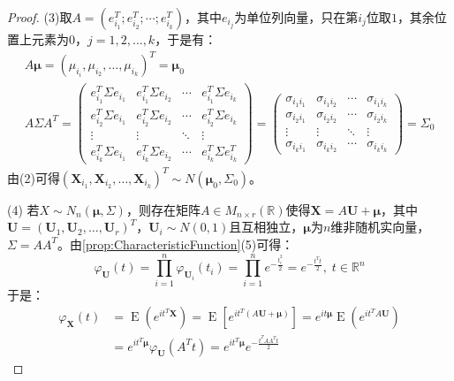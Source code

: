 \begin{proof}
	(3)取$A=(e_{i_1}^T;e_{i_2}^T;\cdots;e_{i_k}^T)$，其中$e_{i_j}$为单位列向量，只在第$i_j$位取$1$，其余位置上元素为$0$，$j=1,2,\dots,k$，于是有：
	\begin{gather*}
		A\boldsymbol{\mu}=(\mu_{i_i},\mu_{i_2},\dots,\mu_{i_k})^T=\boldsymbol{\mu}_0
		\\
		A\Sigma A^T=
		\begin{pmatrix}
			e_{i_1}^T\Sigma e_{i_1} & e_{i_1}^T\Sigma e_{i_2} & \cdots & e_{i_1}^T\Sigma e_{i_k} \\
			e_{i_2}^T\Sigma e_{i_1} & e_{i_2}^T\Sigma e_{i_2} & \cdots & e_{i_2}^T\Sigma e_{i_k} \\
			\vdots & \vdots & \ddots & \vdots \\
			e_{i_k}^T\Sigma e_{i_1} & e_{i_k}^T\Sigma e_{i_2} & \cdots & e_{i_k}^T\Sigma e_{i_k}^T
		\end{pmatrix}
		=
		\begin{pmatrix}
			\sigma_{i_1i_1} & \sigma_{i_1i_2} & \cdots & \sigma_{i_1i_k} \\
			\sigma_{i_2i_1} & \sigma_{i_2i_2} & \cdots & \sigma_{i_2i_k} \\
			\vdots & \vdots & \ddots & \vdots \\
			\sigma_{i_ki_1} & \sigma_{i_ki_2} & \cdots & \sigma_{i_ki_k}
		\end{pmatrix}
		=\Sigma_0
	\end{gather*}
	由(2)可得$(\mathbf{X}_{i_1},\mathbf{X}_{i_2},\dots,\mathbf{X}_{i_k})^T\sim N(\boldsymbol{\mu}_0,\Sigma_0)$。\par
	(4)	若$X\sim N_n(\boldsymbol{\mu},\Sigma)$，则存在矩阵$A\in M_{n\times r}(\mathbb{R})$使得$\mathbf{X}=A\mathbf{U}+\boldsymbol{\mu}$，其中$\mathbf{U}=(\mathbf{U}_1,\mathbf{U}_2,\dots,\mathbf{U}_r)^T$，$\mathbf{U}_i\sim N(0,1)$且互相独立，$\boldsymbol{\mu}$为$n$维非随机实向量，$\Sigma=AA^T$。由\cref{prop:CharacteristicFunction}(5)可得：
	\begin{equation*}
		\varphi_\mathbf{U}(t)=\prod_{i=1}^n\varphi_{\mathbf{U}_i}(t_i)
		=\prod_{i=1}^ne^{-\frac{t_i^2}{2}}=e^{-\frac{t^Tt}{2}},\;t\in\mathbb{R}^{n}
	\end{equation*}
	于是：
	\begin{align*}
		\varphi_\mathbf{X}(t)
		&=\operatorname{E}(e^{it^T\mathbf{X}})
		=\operatorname{E}[e^{it^T(A\mathbf{U}+\boldsymbol{\mu})}]
		=e^{it\boldsymbol{\mu}}\operatorname{E}(e^{it^TA\mathbf{U}}) \\
		&=e^{it^T\boldsymbol{\mu}}\varphi_\mathbf{U}(A^Tt)
		=e^{it^T\boldsymbol{\mu}}e^{-\frac{t^TAA^Tt}{2}}

\end{align*}
\end{proof}
